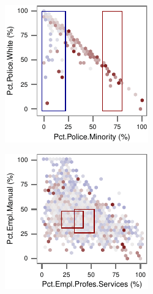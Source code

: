 \begin{figure}[t!]
    \begin{subfigure}[b]{0.4\columnwidth}
    \includegraphics[width=\textwidth]{plots/crime3}
    \end{subfigure}
    \begin{subfigure}[b]{0.4\columnwidth}
    \includegraphics[width=\textwidth]{plots/crime4}
    \end{subfigure}
    

\end{figure}
